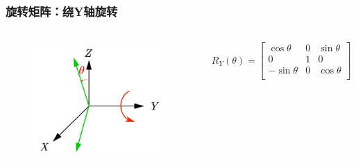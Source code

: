 \documentclass[aspectratio=43]{beamer}
\begin{document}
\begin{frame}
	\frametitle{旋转矩阵：绕Y轴旋转}
	\begin{columns}
		\column{5cm}
		\begin{figure}
			\begin{center}
				\includegraphics[scale=1]{旋转矩阵Y}
			\end{center}
		\end{figure}
		\column{6cm}
		\begin{gather}
			R_Y\left( \theta \right) =\left[ \begin{matrix}
				\cos \theta&		0&		\sin \theta\\
				0&		1&		0\\
				-\sin \theta&		0&		\cos \theta\\
			\end{matrix} \right] 		
		\end{gather}	
	\end{columns}
\end{frame}
\end{document}
